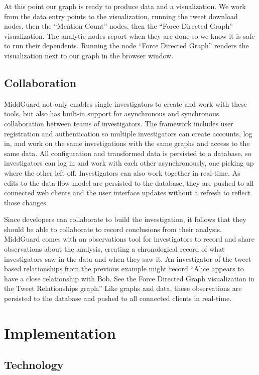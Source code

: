 \documentclass[midd]{thesis}
\begin{document}
At this point our graph is ready to produce data and a visualization. We work
from the data entry points to the visualization, running the tweet download
nodes, then the ``Mention Count'' nodes, then the ``Force Directed Graph''
visualization. The analytic nodes report when they are done so we know it is
safe to run their dependents. Running the node ``Force Directed Graph'' renders
the visualization next to our graph in the browser window.

\section{Collaboration}

MiddGuard not only enables single investigators to create and work with these
tools, but also has built-in support for asynchronous and synchronous
collaboration between teams of investigators. The framework includes user
registration and authentication so multiple investigators can create accounts,
log in, and work on the same investigations with the same graphs and access to
the same data. All configuration and transformed data is persisted to a
database, so investigators can log in and work with each other asynchronously,
one picking up where the other left off. Investigators can also work together in
real-time. As edits to the data-flow model are persisted to the database, they
are pushed to all connected web clients and the user interface updates without a
refresh to reflect those changes.

Since developers can collaborate to build the investigation, it follows that
they should be able to collaborate to record conclusions from their analysis.
MiddGuard comes with an observations tool for investigators to record and share
observations about the analysis, creating a chronological record of what
investigators saw in the data and when they saw it. An investigator of the
tweet-based relationships from the previous example might record ``Alice appears
to have a close relationship with Bob. See the Force Directed Graph
visualization in the Tweet Relationships graph.'' Like graphs and data, these
observations are persisted to the database and pushed to all connected clients
in real-time.

\chapter{Implementation}

\section{Technology}
\end{document}
